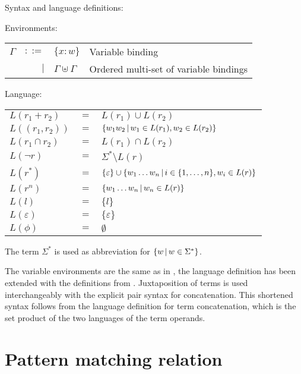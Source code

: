 \begin{defn}
   \label{defn-lang}
   Syntax and language definitions:

   Environments:

   \begin{tabular}{lrll}
      $\Gamma$	& $::=$	& $\{x:w\}$			& Variable binding	\\
		& $|$	& $\Gamma \uplus \Gamma$	& Ordered multi-set of
							  variable bindings	\\
   \end{tabular}

   \needspace{5cm}
   Language:

   \begin{tabular}{lll}
      $L(r_1 + r_2)$	& $=$	& $L(r_1) \cup L(r_2)$					\\
      $L((r_1, r_2))$	& $=$	& $\{ w_1w_2 \operatorname{|} w_1 \in L(r_1), w_2 \in L(r_2) \}$	\\
      $L(r_1 \cap r_2)$	& $=$	& $L(r_1) \cap L(r_2)$					\\
      $L(\neg r)$	& $=$	& $\Sigma^* \setminus L(r)$				\\
      $L(r^*)$		& $=$	&
         $\{\varepsilon\} \cup \{ w_1 \dots w_n \operatorname{|} i
         \in \{ 1, \dots, n \}, w_i \in L(r) \}$	\\
      $L(r^n)$		& $=$	&
         $\{ w_1 \dots w_n \operatorname{|} w_n \in L(r) \}$	\\
      $L(l)$		& $=$	& $\{l\}$						\\
      $L(\varepsilon)$	& $=$	& $\{\varepsilon\}$					\\
      $L(\phi)$		& $=$	& $\emptyset$						\\
   \end{tabular}
\end{defn}


The term $\Sigma^*$ is used as abbreviation for $\{ w \operatorname{|} w \in \Sigma^* \}$.

The variable environments are the same as in \cite{pdpat}, the language
definition has been extended with the definitions from \cite{pdere}.
Juxtaposition of terms is used interchangeably with the explicit pair syntax
for concatenation. This shortened syntax follows from the language definition
for term concatenation, which is the set product of the two languages of the
term operands.


\section{Pattern matching relation}
\label{patmatchrel}

